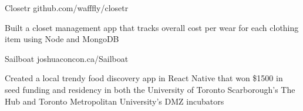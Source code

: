 \begin{cventries}
  \cventry
    {}
    {Closetr}
    {}
    {github.com/wafffly/closetr}
    {}
    {
      \begin{cvitems}
        \item {Built a closet management app that tracks overall cost per wear for each clothing item using Node and MongoDB}
      \end{cvitems}
    }
  \cventry
    {}
    {Sailboat}
    {}
    {joshuaconcon.ca/Sailboat}
    {}
    {
      \begin{cvitems}
        \item {Created a local trendy food discovery app in React Native that won \$1500 in seed funding and residency in both the University of Toronto Scarborough's The Hub and Toronto Metropolitan University's DMZ incubators}
      \end{cvitems}
    }
\end{cventries}